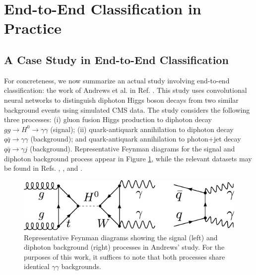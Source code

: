 \documentclass[11pt, a4paper]{article}
\newcommand{\myhref}[2]{\hyperref[#1]{\textcolor{blue}{#2}}}
\begin{document}



\section{End-to-End Classification in Practice}
\subsection{A Case Study in End-to-End Classification}
For concreteness, we now summarize an actual study involving end-to-end classification: the work of Andrews et al. in Ref. \cite{andrews-higgs}.
This study uses convolutional neural networks to distinguish diphoton Higgs boson decays from two similar background events using simulated CMS data.
The study considers the following three processes: (i) gluon fusion Higgs production to diphoton decay  $ gg \to H^{0} \to \gamma \gamma $ (signal); (ii) quark-antiquark annihilation to diphoton decay $ q \bar{q} \to \gamma \gamma $ (background); and quark-antiquark annihilation to photon+jet decay $ q \bar{q} \to \gamma j $ (background).
Representative Feynman diagrams for the signal and diphoton background process appear in Figure \ref{fig:feynman-signal-bg}, while the relevant datasets may be found in Refs. \cite{data-bg-diphoton}, \cite{data-bg-jet}, and \cite{data-signal}.



\begin{figure}[htb!]
    \centering
    \includegraphics[width=0.8\linewidth]{vector/feynman-signal-bg.pdf}
    \caption{Representative Feynman diagrams showing the signal (left) and diphoton background (right) processes in Andrews' study.
    For the purposes of this work, it suffices to note that both processes share identical $ \gamma \gamma $ backgrounds.}
    \label{fig:feynman-signal-bg}
\end{figure}
\end{document}
